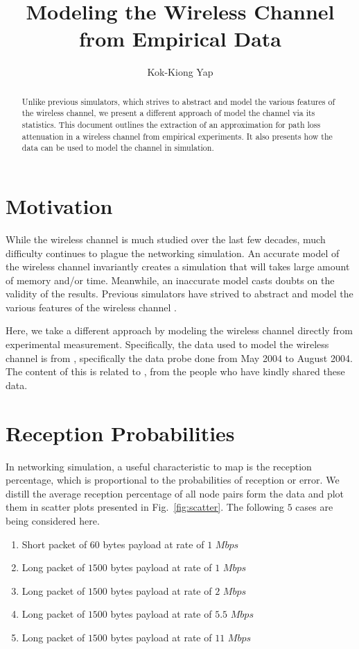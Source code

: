 \documentclass[11pt,twocolumn]{article}
\title{Modeling the Wireless Channel from Empirical Data}
\author{Kok-Kiong Yap}
\begin{document}
\maketitle

\begin{abstract}
Unlike previous simulators, which strives to abstract and model the various features of the wireless channel, we present a different approach of model the channel via its statistics.  This document outlines the extraction of an approximation for path loss attenuation in a wireless channel from empirical experiments.  It also presents how the data can be used to model the channel in simulation.
\end{abstract}

\section{Motivation}
While the wireless channel is much studied over the last few decades, much difficulty continues to plague the networking simulation.  An accurate model of the wireless channel invariantly creates a simulation that will takes large amount of memory and/or time.  Meanwhile, an inaccurate model casts doubts on the validity of the results.   Previous simulators have strived to abstract and model the various features of the wireless channel \cite{ns2}.

Here, we take a different approach by modeling the wireless channel directly from experimental measurement.  Specifically, the data used to model the wireless channel is from \cite{roofnetdata}, specifically the data probe done from May 2004 to August 2004.  The content of this is related to \cite{Aguayo:2004lr}, from the people who have kindly shared these data.

\section{Reception Probabilities}
In networking simulation, a useful characteristic to map is the reception percentage, which is proportional to the probabilities of reception or error.  We distill the average reception percentage of all node pairs form the data and plot them in scatter plots presented in Fig.~\ref{fig:scatter}.  The following $5$ cases are being considered here.
\begin{enumerate}
\item Short packet of $60$ bytes payload at rate of $1$ $Mbps$
\item Long packet of $1500$ bytes payload at rate of $1$ $Mbps$
\item Long packet of $1500$ bytes payload at rate of $2$ $Mbps$
\item Long packet of $1500$ bytes payload at rate of $5.5$ $Mbps$
\item Long packet of $1500$ bytes payload at rate of $11$ $Mbps$
\end{enumerate}
\end{document}
